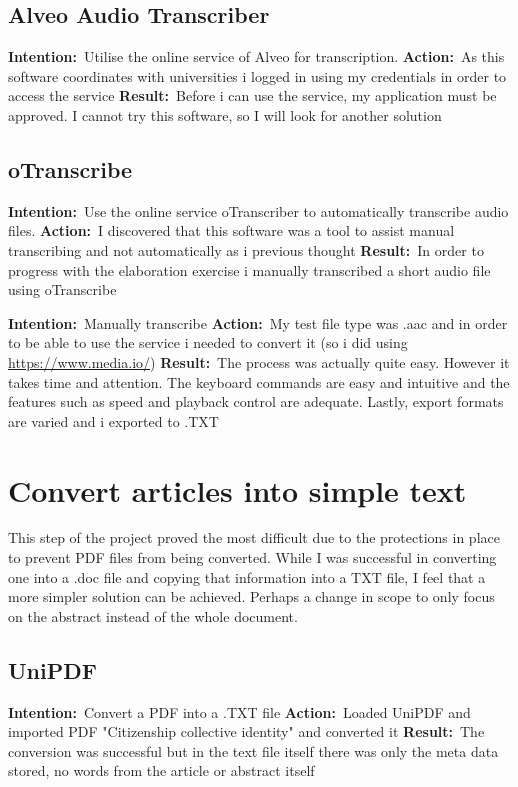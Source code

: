 \documentclass{article}
\newcommand{\intention}[1]{\noindent \textbf{Intention:}{\textnormal\ #1} \newline}
\newcommand{\action}[1]{\textbf{Action:}{\textnormal\ #1} \newline}
\newcommand{\result}[1]{\textbf{Result:}{\textnormal\ #1} \newline}
\begin{document}
\subsection{Alveo Audio Transcriber}

\intention{Utilise the online service of Alveo for transcription.}
\action{As this software coordinates with universities i logged in using my credentials in order to access the service}
\result{Before i can use the service, my application must be approved. I cannot try this software, so I will look for another solution}

\subsection{oTranscribe}

\intention{Use the online service oTranscriber to automatically transcribe audio files.}
\action{I discovered that this software was a tool to assist manual transcribing and not automatically as i previous thought}
\result{In order to progress with the elaboration exercise i manually transcribed a short audio file using oTranscribe}

\intention{Manually transcribe}
\action{My test file type was .aac and in order to be able to use the service i needed to convert it (so i did using \url{https://www.media.io/})}
\result{The process was actually quite easy. However it takes time and attention. The keyboard commands are easy and intuitive and the features such as speed and playback control are adequate. Lastly, export formats are varied and i exported to .TXT}



\section{Convert articles into simple text}
This step of the project proved the most difficult due to the protections in place to prevent PDF files from being converted. While I was successful in converting one into a .doc file and copying that information into a TXT file, I feel that a more simpler solution can be achieved. Perhaps a change in scope to only focus on the abstract instead of the whole document.
\subsection{UniPDF}
\intention{Convert a PDF into a .TXT file}
\action{Loaded UniPDF and imported PDF "Citizenship collective identity" and converted it}
\result{The conversion was successful but in the text file itself there was only the meta data stored, no words from the article or abstract itself}
\end{document}
